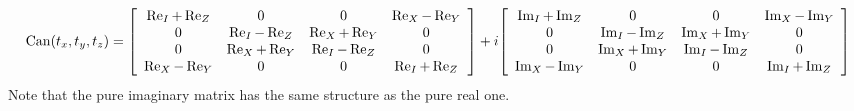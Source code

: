\documentclass{article}
\DeclareMathOperator{\can}{Can}
\begin{document}
$$
\can(t_x,t_y,t_z) = 
\bqty{
\begin{array}{cccc}
  \Re_I + \Re_Z & 0 & 0 & \Re_X - \Re_Y \\
  0 & \Re_I - \Re_Z & \Re_X + \Re_Y & 0 \\
  0 & \Re_X + \Re_Y & \Re_I - \Re_Z & 0 \\
  \Re_X - \Re_Y & 0 & 0 & \Re_I + \Re_Z \\
\end{array}
}
+ i
\bqty{
\begin{array}{cccc}
  \Im_I + \Im_Z & 0 & 0 & \Im_X - \Im_Y \\
  0 & \Im_I - \Im_Z & \Im_X + \Im_Y & 0 \\
  0 & \Im_X + \Im_Y & \Im_I - \Im_Z & 0 \\
  \Im_X - \Im_Y & 0 & 0 & \Im_I + \Im_Z \\
\end{array}
}
$$
Note that the pure imaginary matrix has the same structure as the pure real one. 
\end{document}
